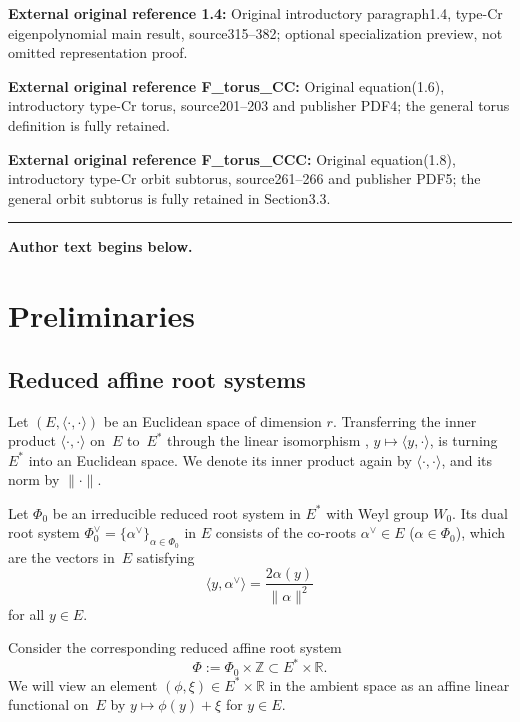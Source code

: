 \documentclass[11pt]{article}
\numberwithin{equation}{section}
\numberwithin{equation}{section}
\begin{document}
\noindent\textbf{External original reference 1.4:} Original introductory paragraph1.4, type-Cr eigenpolynomial main result, source315–382; optional specialization preview, not omitted representation proof.\par
\noindent\textbf{External original reference F\_torus\_CC:} Original equation(1.6), introductory type-Cr torus, source201–203 and publisher PDF4; the general torus definition is fully retained.\par
\noindent\textbf{External original reference F\_torus\_CCC:} Original equation(1.8), introductory type-Cr orbit subtorus, source261–266 and publisher PDF5; the general orbit subtorus is fully retained in Section3.3.\par
\medskip\hrule\medskip\noindent\textbf{Author text begins below.}\par
\setcounter{section}{1}
\section{Preliminaries}\label{prel}

\subsection{Reduced affine root systems}

Let $(E,\langle\cdot,\cdot\rangle)$ be an Euclidean space of dimension $r$. Transferring the inner product $\langle\cdot,\cdot\rangle$ on~$E$ to~$E^*$ through the linear isomorphism , $y\mapsto \langle y,\cdot\rangle$, is turning $E^*$ into an Euclidean space. We denote its inner product again by $\langle\cdot,\cdot\rangle$, and its norm by $\|\cdot\|$.

Let $\Phi_0$ be an irreducible reduced root system in $E^*$ with Weyl group $W_0$. Its dual root system $\Phi_0^\vee=\{\alpha^\vee\}_{\alpha\in\Phi_0}$ in $E$ consists of the co-roots $\alpha^\vee\in E$ ($\alpha\in\Phi_0$), which are the vectors in~$E$ satisfying
\begin{equation}\label{corootdef}
\bigl\langle y,\alpha^\vee\bigr\rangle=\frac{2\alpha(y)}{\|\alpha\|^2}
\end{equation}
for all $y\in E$.

Consider the corresponding reduced affine root system
\[
\Phi:=\Phi_0\times \mathbb{Z}\subset E^*\times\mathbb{R}.
\]
We will view an element $(\phi,\xi)\in E^*\times\mathbb{R}$ in the ambient space as an affine linear functional on~$E$ by $y\mapsto\phi(y)+\xi$ for $y\in E$.
\end{document}
